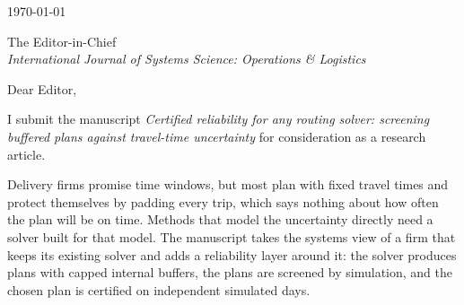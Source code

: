 \documentclass[11pt,a4paper]{article}
\begin{document}
\today

The Editor-in-Chief\\
\emph{International Journal of Systems Science: Operations \& Logistics}

Dear Editor,

I submit the manuscript \emph{Certified reliability for any routing solver: screening
buffered plans against travel-time uncertainty} for consideration as a research
article.

Delivery firms promise time windows, but most plan with fixed travel times and protect
themselves by padding every trip, which says nothing about how often the plan will be on
time. Methods that model the uncertainty directly need a solver built for that model. The
manuscript takes the systems view of a firm that keeps its existing solver and adds a
reliability layer around it: the solver produces plans with capped internal buffers, the
plans are screened by simulation, and the chosen plan is certified on independent
simulated days.
\end{document}
